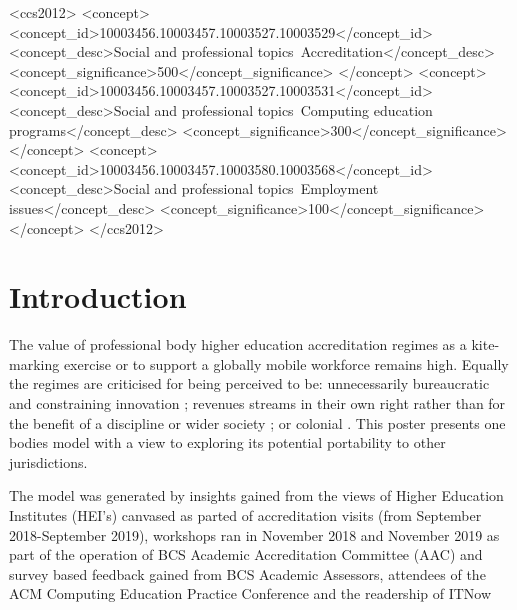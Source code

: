 \documentclass[sigconf]{acmart}
\begin{document}
%
%
 \begin{CCSXML}
	<ccs2012>
	<concept>
	<concept_id>10003456.10003457.10003527.10003529</concept_id>
	<concept_desc>Social and professional topics~Accreditation</concept_desc>
	<concept_significance>500</concept_significance>
	</concept>
	<concept>
	<concept_id>10003456.10003457.10003527.10003531</concept_id>
	<concept_desc>Social and professional topics~Computing education programs</concept_desc>
	<concept_significance>300</concept_significance>
	</concept>
	<concept>
	<concept_id>10003456.10003457.10003580.10003568</concept_id>
	<concept_desc>Social and professional topics~Employment issues</concept_desc>
	<concept_significance>100</concept_significance>
	</concept>
	</ccs2012>
\end{CCSXML}


%


%
\maketitle


\section{Introduction}
The value of professional body higher education accreditation regimes as a kite-marking exercise or to support a globally mobile workforce \cite{Knight_2015} remains high. Equally the regimes are criticised for being perceived to be: unnecessarily bureaucratic and constraining innovation \cite{Harvey2004}; revenues streams in their own right rather than for the benefit of a discipline or wider society \cite{Knight_2015}; or colonial \cite{Mutereko2017}.  This poster presents one bodies model with a view to exploring its potential portability to other jurisdictions.

The model was generated by insights gained from the views of Higher Education Institutes (HEI's) canvased as parted of accreditation visits (from September 2018-September 2019), workshops ran in November 2018 and November 2019 as part of the operation of BCS Academic Accreditation Committee (AAC) and survey based feedback gained from BCS Academic Assessors,  attendees of the ACM Computing Education Practice Conference \cite{CrickEtAl2020Cep} and the readership of ITNow \cite{CrickEtAl2020ITNow}
\end{document}
